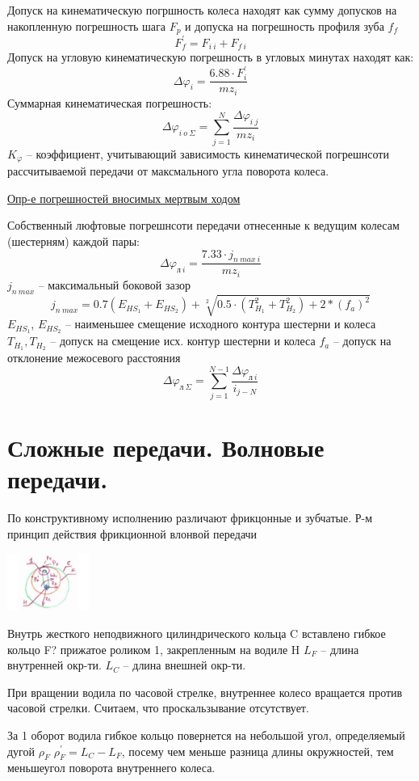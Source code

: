 \documentclass{article}
\begin{document}
Допуск на кинематическую погршность колеса находят как сумму допусков на накопленную погрешность шага $F_p$
и допуска на погрешность профиля зуба $f_f$
$$
F_{f}^{'} = F_{i\:i} + F_{f\:i}
$$
Допуск на угловую кинематическую погрешность в угловых минутах находят как:
$$
\Delta \varphi_i = \frac{6.88 \cdot F_i^{'}}{m z_i} 
$$
Суммарная кинематическая погрешность:
$$
\Delta \varphi_{i\:o\:\Sigma} = \sum\limits_{j = 1}^{N} \frac{ \Delta \varphi_{i\:j}}{m z_i}
$$
$K_\varphi$ -- коэффициент, учитывающий зависимость кинематической погрешнсоти рассчитываемой передачи от максмального 
угла поворота колеса.

\underline{Опр-е погрешностей вносимых мертвым ходом}

Собственный люфтовые погрешнсоти передачи отнесенные к ведущим колесам (шестерням) каждой пары:
$$
\Delta \varphi_{л \: i} = \frac{7.33 \cdot j_{n\:max\:i}}{m z_i} 
$$
$j_{n\:max}$ -- максимальный боковой зазор
$$
j_{n\:max} = 0.7 \left (E_{HS_1} + E_{HS_2}\right) + \sqrt[2]{0.5\cdot\left(T_{H_1}^2 + T_{H_2}^2\right) + 2 * \left(f_a\right)^2}
$$
$E_{HS_1}$, $E_{HS_2}$ -- наименьшее смещение исходного контура шестерни и колеса
$T_{H_1}, T_{H_2}$ -- допуск на смещение исх. контур шестерни и колеса
$f_a$ -- допуск на отклонение межосевого расстояния
$$
\Delta \varphi_{л\:\Sigma} = \sum\limits_{j=1}^{N-1} \frac{ \Delta \varphi_{л \: i}}{i_{j - N}} 
$$

\section {Сложные передачи. Волновые передачи.}

По конструктивному исполнению различают фрикцонные и зубчатые. Р-м принцип действия фрикционной влонвой передачи

\includegraphics[width = 0.2\textwidth]{15_1}

Внутрь жесткого неподвижного цилиндрического кольца C вставлено гибкое кольцо F? прижатое роликом 1, закрепленным на водиле H
$L_F$ -- длина внутренней окр-ти.
$L_C$ -- длина внешней окр-ти.

При вращении водила по часовой стрелке, внутреннее колесо вращается против часовой стрелки. Считаем, что проскальзывание отсутствует.

За 1 оборот водила гибкое кольцо повернется на небольшой угол, определяемый дугой $\rho_F$ $\rho_F^{'} = L_C - L_F$, посему чем меньше разница длины окружностей, тем меньшеугол поворота внутреннего колеса.
\end{document}
